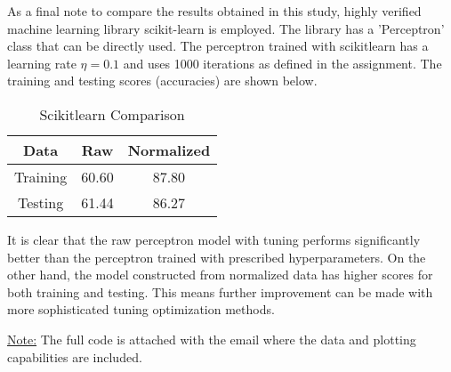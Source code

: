 \documentclass[11pt]{article}
\begin{document}
As a final note to compare the results obtained in this study, highly verified machine learning library scikit-learn is employed. The library has a 'Perceptron' class that can be directly used. The perceptron trained with scikitlearn has a learning rate $\eta = 0.1$ and uses 1000 iterations as defined in the assignment. The training and testing scores (accuracies) are shown below.
\bgroup
\def\arraystretch{1.5}%
\begin{table}[H]
\centering
\caption{Scikitlearn Comparison}
\begin{tabular}{|c|c|c|}
\hline
Data     & \quad  Raw   \quad & Normalized\\ \hline
Training &  60.60 & 87.80\\ \hline
Testing  &  61.44 & 86.27\\ \hline
\end{tabular}
\label{table:q2_sci}
\end{table}
\egroup

It is clear that the raw perceptron model with tuning performs significantly better than the perceptron trained with prescribed hyperparameters. On the other hand, the model constructed from normalized data has higher scores for both training and testing. This means further improvement can be made with more sophisticated tuning optimization methods.

\newpage


\underline{Note:} The full code is attached with the email where the data and plotting capabilities are included.
\end{document}
